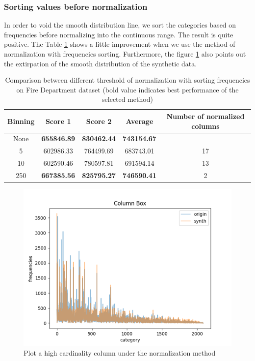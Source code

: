 \documentclass{article}
\begin{document}
\subsubsection{Sorting values before normalization}

In order to void the smooth distribution line, we sort the categories based on frequencies before normalizing into the continuous range. The result is quite positive. The Table \ref{tab:sortfire} shows a little improvement when we use the method of normalization with frequencies sorting. Furthermore, the figure \ref{fig:sortfire} also points out the extirpation of the smooth distribution of the synthetic data.

\begin{table}[htpb]\centering
\begin{tabular}{ccccc}
	\hline
	\textbf{Binning} & \textbf{Score 1}   & \textbf{Score 2}   & \textbf{Average}   & \textbf{Number of normalized columns} \\ \hline
	None             & \textbf{655846.89} & \textbf{830462.44} & \textbf{743154.67} & \multicolumn{1}{l}{}                  \\ \hline
	5                & 602986.33          & 764499.69          & 683743.01          & 17                                    \\ \hline
	10               & 602590.46          & 780597.81          & 691594.14          & 13                                    \\ \hline
	250              & \textbf{667385.56} & \textbf{825795.27} & \textbf{746590.41} & 2                                     \\ \hline
\end{tabular}
\caption{Comparison between different threshold of normalization with sorting frequencies on Fire Department dataset (bold value indicates best performance of the selected method)}
\label{tab:sortfire}
\end{table}


\begin{figure}[h]
	\centering
	\includegraphics[scale=0.5]{figures/sortbox.png}
	\caption{Plot a high cardinality column under the normalization method}
	\label{fig:sortfire}
\end{figure}
\end{document}
